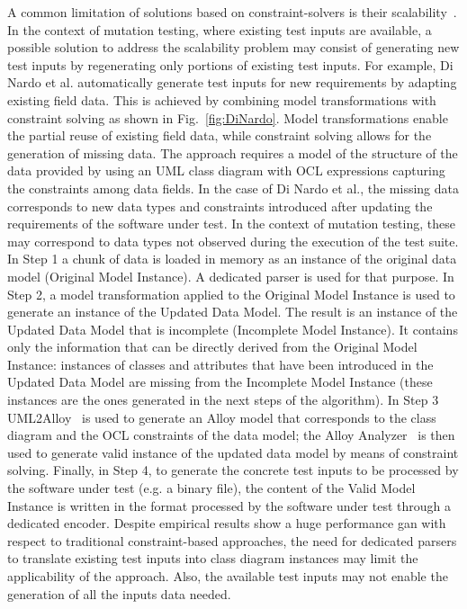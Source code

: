 A common limitation of solutions based on constraint-solvers is their scalability~\cite{}. In the context of mutation testing, where existing test inputs are available, a possible solution to address the scalability problem may consist of generating new test inputs by regenerating only portions of existing test inputs.
For example, Di Nardo et al. automatically generate test inputs for new requirements by adapting existing field data.
This is achieved by combining model transformations with constraint solving as shown in Fig.~\ref{fig:DiNardo}.
Model transformations enable the partial reuse of existing field data, while constraint solving allows for the generation of missing data. The approach requires a model of the structure of the data provided by using an UML class diagram with OCL expressions capturing the constraints among data fields. In the case of Di Nardo et al., the missing data corresponds to new data types and constraints introduced after updating the requirements of the software under test. In the context of mutation testing, these may correspond to data types not observed during the execution of the test suite.
In Step 1 a chunk of data is loaded in memory as an instance of the original data model (Original Model Instance).
A dedicated parser is used for that purpose.
In Step 2, a model transformation applied to the Original Model Instance is used to generate an instance of the Updated Data Model. The result is an instance of the Updated Data Model that is incomplete (Incomplete Model Instance).
It contains only the information that can be directly derived from the Original Model Instance:
instances of classes and attributes that have been introduced in the Updated Data Model are missing from the Incomplete Model Instance (these instances are the ones generated in the next steps of the algorithm).
In Step 3 UML2Alloy~\cite{Uml2alloy} is used to generate an Alloy model that corresponds to the class diagram and the OCL constraints of the data model; the Alloy Analyzer~\cite{AlloyWeb} is then used to generate  valid instance of the updated data model by means of constraint solving. 
Finally, in Step 4, to generate the concrete test inputs to be processed by the software under test (e.g. a binary file), the content of the Valid Model Instance is written in the format processed by the software under test through a dedicated encoder.
Despite empirical results show a huge performance gan with respect to traditional constraint-based approaches, the need for dedicated parsers to translate existing test inputs into class diagram instances may limit the applicability of the approach. Also, the available test inputs may not enable the generation of all the inputs data needed.

